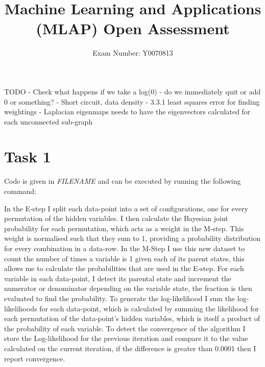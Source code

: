 \documentclass{article}
\begin{document}
\title{Machine Learning and Applications (MLAP) Open Assessment}
\author{Exam Number: Y0070813}
\date{\vspace{-5ex}}
\maketitle
TODO - Check what happens if we take a log(0) - do we immediately quit or add 0 or something?
- Short circuit, data density	
 - 3.3.1 least squares error for finding weightings
- Laplacian eigenmaps needs to have the eigenvectors calculated for each unconnected sub-graph
\section{Task 1}
Code is given in \textit{FILENAME} and can be executed by running the following command: 


In the E-step I split each data-point into a set of configurations, one for every permutation of the hidden variables. I then calculate the Bayesian joint probability for each permutation, which acts as a weight in the M-step. This weight is normalised such that they sum to 1, providing a probability distribution for every combination in a data-row. 
In the M-Step I use this new dataset to count the number of times a variable is 1 given each of its parent states, this allows me to calculate the probabilities that are used in the E-step. For each variable in each data-point, I detect its parental state and increment the numerator or denominator depending on the variable state, the fraction is then evaluated to find the probability. 
To generate the log-likelihood I sum the log-likelihoods for each data-point, which is calculated by summing the likelihood for each permutation of the data-point's hidden variables, which is itself a product of the probability of each variable.
To detect the convergence of the algorithm I store the Log-likelihood for the previous iteration and compare it to the value calculated on the current iteration, if the difference is greater than 0.0001 then I report convergence.
\end{document}
